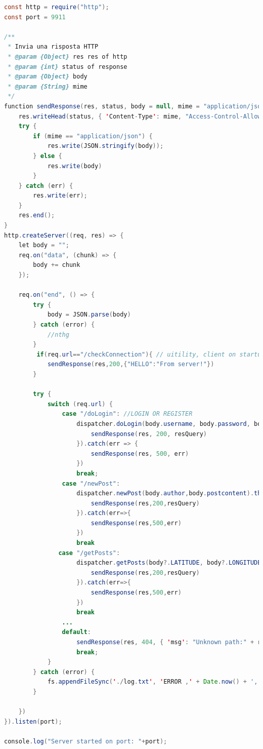\documentclass[conference]{IEEEtran}
\begin{document}
\begin{lstlisting}[language=Java, caption=Snippet of GeoMedia HTTP server]
const http = require("http");
const port = 9911

/**
 * Invia una risposta HTTP
 * @param {Object} res res of http 
 * @param {int} status of response 
 * @param {Object} body 
 * @param {String} mime 
 */
function sendResponse(res, status, body = null, mime = "application/json") {
    res.writeHead(status, { 'Content-Type': mime, "Access-Control-Allow-Origin": "*" });
    try {
        if (mime == "application/json") {
            res.write(JSON.stringify(body));
        } else {
            res.write(body)
        }
    } catch (err) {
        res.write(err);
    }
    res.end();
}
http.createServer((req, res) => {
    let body = "";
    req.on("data", (chunk) => {
        body += chunk
    });

    req.on("end", () => {
        try {
            body = JSON.parse(body)
        } catch (error) {
            //nthg
        }
         if(req.url=="/checkConnection"){ // uitility, client on startup send this request, to make sure its configuratin is correct. If server responds the configuration is right
            sendResponse(res,200,{"HELLO":"From server!"})
        }

        try {
            switch (req.url) {
                case "/doLogin": //LOGIN OR REGISTER
                    dispatcher.doLogin(body.username, body.password, body.newuser).then(resQuery => {
                        sendResponse(res, 200, resQuery)
                    }).catch(err => {
                        sendResponse(res, 500, err)
                    })
                    break;
                case "/newPost":
                    dispatcher.newPost(body.author,body.postcontent).then(resQuery=>{
                        sendResponse(res,200,resQuery)
                    }).catch(err=>{
                        sendResponse(res,500,err)
                    })
                    break
               case "/getPosts":
                    dispatcher.getPosts(body?.LATITUDE, body?.LONGITUDE,body?.USERNAME).then(resQuery=>{
                        sendResponse(res,200,resQuery)
                    }).catch(err=>{
                        sendResponse(res,500,err)
                    })
                    break
                ...
                default:
                    sendResponse(res, 404, { 'msg': "Unknown path:" + req.url })
                    break;
            }
        } catch (error) {
            fs.appendFileSync('./log.txt', 'ERROR ,' + Date.now() + ',' + error)
        }

    })
}).listen(port);

console.log("Server started on port: "+port);

\end{lstlisting}
\end{document}

